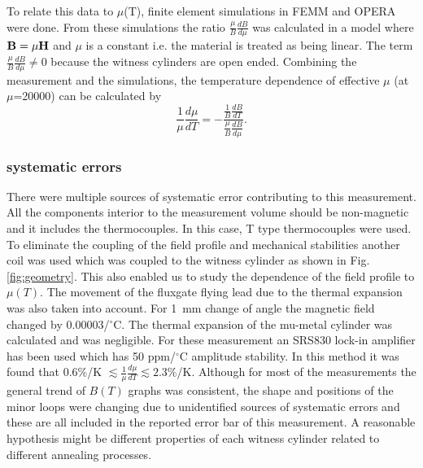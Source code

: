 \documentclass[review]{elsarticle}
\begin{document}
To relate this data to $\mu $(T), finite element simulations in FEMM and OPERA were done. From these simulations the ratio $\frac{\mu}{B} \frac{dB}{d\mu}$ was calculated in a model where $\bold{B} = \mu \bold{H}$ and $\mu $ is a constant i.e. the material is treated as being linear. The term $\frac{\mu}{B}\frac{dB}{d\mu}\neq 0$ because the witness cylinders are open ended. Combining the measurement and the simulations, the temperature dependence of effective $\mu$ (at $\mu$=20000) can be calculated by
\begin{equation}
\frac{1}{\mu}\frac{d\mu}{dT}= -\frac{\frac{1}{B}\frac{dB}{dT}}{\frac{\mu}{B}\frac{dB}{d\mu}}.
\end{equation}
\subsubsection{systematic errors}
There were multiple sources of systematic error contributing to this measurement. All the components interior to the measurement volume should be non-magnetic and it includes the thermocouples. In this case, T type thermocouples were used.
To eliminate the coupling of the field profile and mechanical stabilities another coil was used which was coupled to the witness cylinder as shown in Fig. \ref{fig:geometry}. This also enabled us to study the dependence of the field profile to $\mu(T)$.
The movement of the fluxgate flying lead due to the thermal expansion was also taken into account. For 1~mm change of angle the magnetic field changed by 0.00003/$^\circ$C. The thermal expansion of the mu-metal cylinder was calculated and was negligible. For these measurement an SRS830 lock-in amplifier has been used which has 50 ppm/$^\circ$C amplitude stability.
In this method it was found that 0.6\%/K $\lesssim\frac{1}{\mu}\frac{d\mu}{dT}\lesssim 2.3\%$/K. Although for most of the measurements the general trend of $B(T)$ graphs was consistent, the shape and positions of the minor loops were changing due to unidentified sources of systematic errors and these are all included in the reported error bar of this measurement. A reasonable hypothesis might be different properties of each witness cylinder related to different annealing processes.
\end{document}
